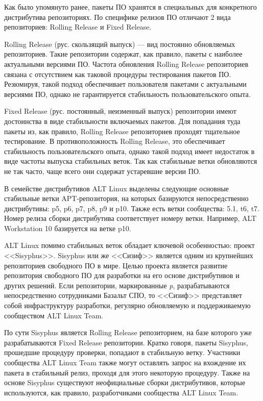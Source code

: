 \documentclass[bachelor, och, pract]{SCWorks}
\begin{document}
Как было упомянуто ранее, пакеты ПО хранятся в специальных для конкретного дистрибутива репозиториях.
По специфике релизов ПО отличают 2 вида репозиториев: Rolling Release и Fixed Release.

Rolling Release (рус. скользящий выпуск) --- вид постоянно обновляемых репозиториев.
Такие репозитории содержат, как правило, пакеты с наиболее актуальными версиями ПО.
Частота обновления Rolling Release репозиториев связана с отсутствием как таковой процедуры тестирования пакетов ПО.
Резюмируя, такой подход обеспечивает пользователя пакетами с актуальными версиями ПО, однако не гарантируется стабильность пользовательского опыта.

Fixed Release (рус. постоянный, неизменный выпуск) репозитории имеют достоинства в виде стабильности включаемых пакетов.
Для попадания туда пакеты из, как правило, Rolling Release репозиториев проходят тщательное тестирование.
В противоположность Rolling Release, это обеспечивает стабильность пользовательского опыта, однако такой подход имеет недостаток в виде частоты выпуска стабильных веток.
Так как стабильные ветки обновляются не так часто, чаще всего они содержат устаревшие версии ПО.

В семействе дистрибутивов ALT Linux выделены следующие основные стабильные ветки APT-репозитория, на которых базируются непосредственно дистрибутивы: p5, p6, p7, p8, p9 и p10.
Также есть ветки сообщества: 5.1, t6, t7. Номер релиза сборки дистрибутива соответствует номеру ветки.
Например, ALT Workstation 10 базируется на ветке p10.

ALT Linux помимо стабильных веток обладает ключевой особенностью: проект <<Sisyphus>>.
Sisyphus или же <<Сизиф>> является одним из крупнейших репозиториев свободного ПО в мире.
Целью проекта является развитие репозитория свободного ПО для разработки на его основе дистрибутивов и других решений.
Если репозитории, маркированные \textit{p}, разрабатываются непосредственно сотрудниками Базальт СПО, то <<Сизиф>> представляет собой инфраструктуру разработки,
регулярно обновляемую и поддерживаемую сообществом ALT Linux Team\cite{a_sisyphus}.

По сути Sisyphus является Rolling Release репозиторием, на базе которого уже разрабатываются Fixed Release репозитории.
Кратко говоря, пакеты Sisyphus, прошедшие процедуру проверки, попадают в стабильную ветку.
Участники сообщества ALT Linux Team также могут оставлять запрос на вхождение их пакета в стабильный релиз, проходя для этого некоторую процедуру.
Также на основе Sisyphus существуют неофициальные сборки дистрибутивов, которые используются, как правило, разработчиками сообщества ALT Linux Team.
\end{document}
